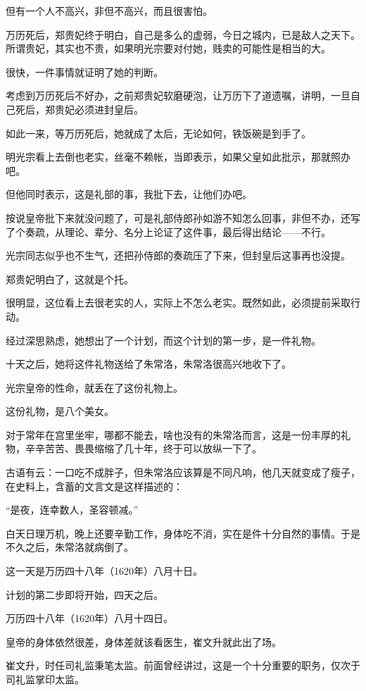 \begin{multicols}{\theparacolNo}
		但有一个人不高兴，非但不高兴，而且很害怕。

		万历死后，郑贵妃终于明白，自己是多么的虚弱，今日之城内，已是敌人之天下。所谓贵妃，其实也不贵，如果明光宗要对付她，贱卖的可能性是相当的大。

		很快，一件事情就证明了她的判断。

		考虑到万历死后不好办，之前郑贵妃软磨硬泡，让万历下了道遗嘱，讲明，一旦自己死后，郑贵妃必须进封皇后。

		如此一来，等万历死后，她就成了太后，无论如何，铁饭碗是到手了。

		明光宗看上去倒也老实，丝毫不赖帐，当即表示，如果父皇如此批示，那就照办吧。

		但他同时表示，这是礼部的事，我批下去，让他们办吧。

		按说皇帝批下来就没问题了，可是礼部侍郎孙如游不知怎么回事，非但不办，还写了个奏疏，从理论、辈分、名分上论证了这件事，最后得出结论——不行。

		光宗同志似乎也不生气，还把孙侍郎的奏疏压了下来，但封皇后这事再也没提。

		郑贵妃明白了，这就是个托。

		很明显，这位看上去很老实的人，实际上不怎么老实。既然如此，必须提前采取行动。

		经过深思熟虑，她想出了一个计划，而这个计划的第一步，是一件礼物。

		十天之后，她将这件礼物送给了朱常洛，朱常洛很高兴地收下了。

		光宗皇帝的性命，就丢在了这份礼物上。

		这份礼物，是八个美女。

		对于常年在宫里坐牢，哪都不能去，啥也没有的朱常洛而言，这是一份丰厚的礼物，辛辛苦苦、畏畏缩缩了几十年，终于可以放纵一下了。

		古语有云：一口吃不成胖子，但朱常洛应该算是不同凡响，他几天就变成了瘦子，在史料上，含蓄的文言文是这样描述的：

		“是夜，连幸数人，圣容顿减。”

		白天日理万机，晚上还要辛勤工作，身体吃不消，实在是件十分自然的事情。于是不久之后，朱常洛就病倒了。

		这一天是万历四十八年（1620年）八月十日。

		计划的第二步即将开始，四天之后。

		万历四十八年（1620年）八月十四日。

		皇帝的身体依然很差，身体差就该看医生，崔文升就此出了场。

		崔文升，时任司礼监秉笔太监。前面曾经讲过，这是一个十分重要的职务，仅次于司礼监掌印太监。


\end{multicols}
